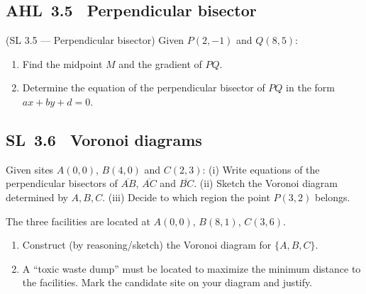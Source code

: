 \documentclass[11pt]{article}
\def\textbf#1{#1}%
\newcommand{\tocsubsection}[1]{\subsection{#1}}
\newcounter{question}
\begin{document}
\tocsubsection{AHL 3.5 \; Perpendicular bisector}
\begin{question}
\textbf{(SL 3.5 — Perpendicular bisector)} Given $P(2,-1)$ and $Q(8,5)$:
\begin{enumerate}
  \item Find the midpoint $M$ and the gradient of $PQ$.
  \item Determine the equation of the perpendicular bisector of $PQ$ in the form $ax+by+d=0$.
\end{enumerate}
\begin{center}
\end{center}
\end{question}

\tocsubsection{SL 3.6 \; Voronoi diagrams}

\begin{question}
Given sites $A(0,0)$, $B(4,0)$ and $C(2,3)$:
(i) Write equations of the perpendicular bisectors of $\overline{AB}$, $\overline{AC}$ and $\overline{BC}$.
(ii) Sketch the Voronoi diagram determined by $A,B,C$.
(iii) Decide to which region the point $P(3,2)$ belongs.
\end{question}


\begin{question}
 The three facilities are located at $A(0,0)$, $B(8,1)$, $C(3,6)$. 
\begin{enumerate}
  \item Construct (by reasoning/sketch) the Voronoi diagram for $\{A,B,C\}$.
  \item A “toxic waste dump” must be located to maximize the minimum distance to the facilities. Mark the candidate site on your diagram and justify.
\end{enumerate}
\begin{center}
\end{center}
\end{question}
\end{document}
